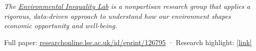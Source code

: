 \documentclass[
  11pt,
]{article}
\begin{document}
\vspace{11pt}

\begin{center}{\color{muted}\itshape\fontsize{9.5pt}{14pt}\selectfont
The \href{https://www.environmental-inequality-lab.org/}{\color{cite}\underline{Environmental Inequality Lab}} is a nonpartisan research group that applies a rigorous, data-driven approach to understand how our environment shapes economic opportunity and well-being.\par}
\end{center}

\vspace{10pt}

\begin{center}{\color{faint}\fontsize{8pt}{11pt}\selectfont
Full paper: \href{https://researchonline.lse.ac.uk/id/eprint/126795}{\color{faint}\underline{researchonline.lse.ac.uk/id/eprint/126795}} \quad·\quad
Research highlight: \href{[URL]}{\color{faint}\underline{[link]}}\par}
\end{center}
\end{document}
